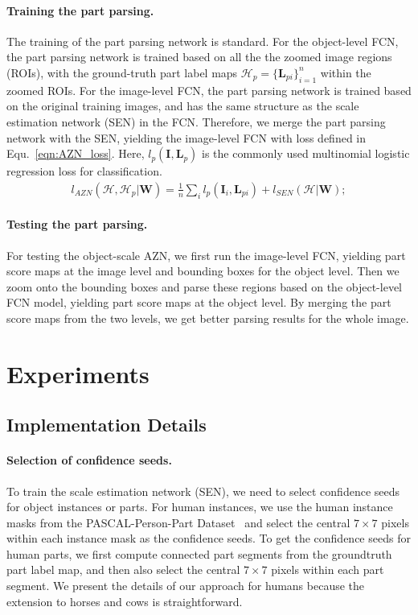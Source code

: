 \documentclass[runningheads]{llncs}
\newcommand{\hua}[1]{{\mathcal #1}}
\newcommand{\ve}[1]{{\mathbf #1}}
\begin{document}
\paragraph{Training the part parsing.} The training of the part parsing network is standard. For the object-level FCN, the part parsing network is trained based on all the the zoomed image regions (ROIs), with the ground-truth part label maps $\hua{H_p} = \{\ve{L}_{pi}\}_{i=1}^{n}$ within the zoomed ROIs. For the image-level FCN, the part parsing network is trained based on the original training images, and has the same structure as the scale estimation network (SEN) in the FCN. Therefore, we merge the part parsing network with the SEN, yielding the image-level FCN with loss defined in Equ.~\ref{eqn:AZN_loss}. Here,  $l_{p}(\ve{I}, \ve{L}_{p})$ is the commonly used multinomial logistic regression loss for classification.
\begin{align}
l_{AZN}(\hua{H},\hua{H_p}|\ve{W}) =\frac{1}{n}\sum\nolimits_il_{p}(\ve{I}_i, \ve{L}_{pi}) + l_{SEN}(\hua{H}|\ve{W});
\label{eqn:AZN_loss}
\end{align}

\paragraph{Testing the part parsing.}  For testing the object-scale AZN, we first run the image-level FCN, yielding part score maps at the image level and bounding boxes for the object level. Then we zoom onto the bounding boxes and parse these regions based on the object-level FCN model, yielding part score maps at the object level. By merging the part score maps from the two levels, we get better parsing results for the whole image.

\section{Experiments}
\label{sec:exp}
\vspace{-0.4\baselineskip}
\subsection{Implementation Details}
\label{subsec:impDetails}
\paragraph{Selection of confidence seeds.}
To train the scale estimation network (SEN), we need to select confidence seeds for object instances or parts. For human instances, we use the human instance masks from the PASCAL-Person-Part Dataset~\cite{chen2014detect} and select the central $7\times7$ pixels within each instance mask as the confidence seeds. To get the confidence seeds for human parts, we first compute connected part segments from the groundtruth part label map, and then also select the central $7\times7$ pixels within each part segment. We present the details of our approach for humans because the extension to horses and cows is straightforward.
\end{document}
